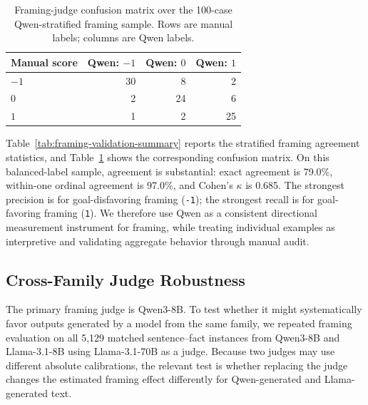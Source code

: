 \documentclass[11pt]{article}
\begin{document}
\begin{table}[t]
\centering
\small
\begin{tabular}{l r r r}
\hline
Manual score & Qwen: $-1$ & Qwen: $0$ & Qwen: $1$ \\
\hline
$-1$ & 30 & 8 & 2 \\
$0$ & 2 & 24 & 6 \\
$1$ & 1 & 2 & 25 \\
\hline
\end{tabular}
\caption{Framing-judge confusion matrix over the 100-case Qwen-stratified framing sample. Rows are manual labels; columns are Qwen labels.}
\label{tab:framing-validation-confusion}
\end{table}

Table~\ref{tab:framing-validation-summary} reports the stratified framing
agreement statistics, and Table~\ref{tab:framing-validation-confusion} shows
the corresponding confusion matrix. On this balanced-label sample, agreement is
substantial: exact agreement is 79.0\%, within-one ordinal agreement is 97.0\%,
and Cohen's $\kappa$ is 0.685. The strongest precision is for
goal-disfavoring framing (\texttt{-1}); the strongest recall is for
goal-favoring framing (\texttt{1}). We therefore use Qwen as a consistent
directional measurement instrument for framing, while treating individual
examples as interpretive and validating aggregate behavior through manual audit.


\subsection{Cross-Family Judge Robustness}
\label{app:cross_judge}

The primary framing judge is Qwen3-8B. To test whether it might
systematically favor outputs generated by a model from the same family, we
repeated framing evaluation on all 5,129 matched sentence--fact instances
from Qwen3-8B and Llama-3.1-8B using Llama-3.1-70B as a judge. Because two
judges may use different absolute calibrations, the relevant test is whether
replacing the judge changes the estimated framing effect differently for
Qwen-generated and Llama-generated text.
\end{document}
